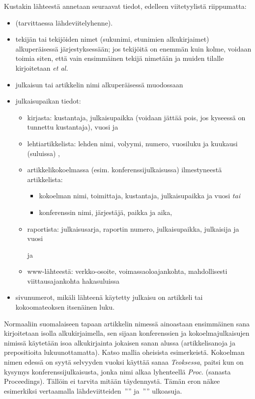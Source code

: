 \documentclass[finnish,gradu]{tktltiki}
\begin{document}
Kustakin lähteestä annetaan seuraavat tiedot, edelleen viitetyylistä riippumatta:
\begin{itemize}
\item (tarvittaessa lähdeviitelyhenne).
\item
tekijän tai tekijöiden nimet (sukunimi, etunimien alkukirjaimet)
alkuperäisessä järjestyksessään; jos tekijöitä on enemmän kuin kolme,
voidaan toimia siten, että
vain ensimmäinen tekijä nimetään ja muiden tilalle kirjoitetaan {\em et
al.}
\item
julkaisun tai artikkelin nimi alkuperäisessä muodossaan
\item
julkaisupaikan tiedot:
\begin{itemize}
\item
kirjasta: kustantaja, julkaisupaikka (voidaan jättää pois, jos kyseessä
on tunnettu kustantaja), vuosi
 ja
\item
lehtiartikkelista: lehden nimi, volyymi, numero, vuosiluku ja kuukausi (suluissa)
,

\item
artikkelikokoelmassa (esim. konferenssijulkaisussa) ilmestyneestä
artikkelista:
\begin{itemize}
\item kokoelman nimi, toimittaja, kustantaja, julkaisupaikka ja vuosi
{\em tai}
\item konferenssin nimi, järjestäjä, paikka ja aika,
\end{itemize}
\item
raportista: julkaisusarja, raportin numero, julkaisupaikka, julkaisija ja vuosi

ja
\item
www-lähteestä: verkko-osoite, voimassaoloajankohta, mahdollisesti
viittausajankohta hakasuluissa
\end{itemize}
\item
sivunumerot, mikäli lähteenä käytetty julkaisu on artikkeli tai kokoomateoksen itsenäinen luku.
\end{itemize}

Normaaliin suomalaiseen tapaan artikkelin nimessä ainoastaan
ensimmäinen sana kirjoitetaan isolla alkukirjaimella, sen sijaan
konferenssien ja kokoelmajulkaisujen nimissä käytetään isoa
alkukirjainta jokaisen sanan alussa (artikkelisanoja ja prepositioita
lukuunottamatta). Katso mallia oheisista esimerkeistä.
Kokoelman nimen edessä on syytä selvyyden vuoksi käyttää sanaa {\em
Teoksessa}, paitsi kun on kysymys konferenssijulkaisusta, jonka nimi
alkaa lyhenteellä {\em Proc.} (sanasta Proceedings). Tällöin ei tarvita
mitään täydennystä.
Tämän eron näkee esimerkiksi vertaamalla
lähdeviitteiden~''\cite{dantowsley90}''
ja~''\cite{gannonetal89}'' ulkoasuja.
\end{document}
